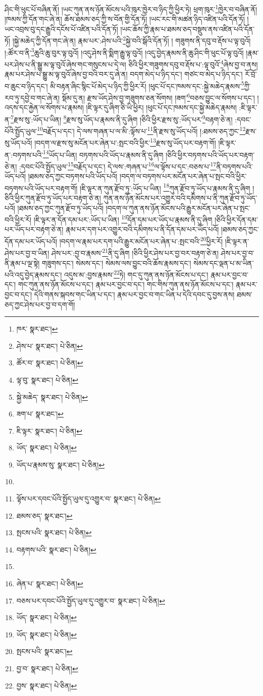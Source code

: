 ཤིང་གི་ཕུང་པོ་བཞིན་ནོ། །ཡང་ཀུན་ནས་ཉོན་མོངས་པའི་ཁུར་ཁྱེར་བ་ཉིད་ཀྱི་ཕྱིར་ཏེ། ཕྲག་ཁུར་\footnote{ཁར་  སྣར་ཐང་། }ཁྱེར་བ་བཞིན་ནོ། །ཁམས་ཀྱི་དོན་གང་ཞེ་ན། ཆོས་ཐམས་ཅད་ཀྱི་ས་བོན་གྱི་དོན་ཏོ། །ཡང་རང་གི་མཚན་ཉིད་འཛིན་པའི་དོན་ཏོ། །ཡང་འབྲས་བུ་དང་རྒྱུའི་དངོས་པོ་འཛིན་པའི་དོན་ཏོ། །ཡང་ཆོས་ཀྱི་རྣམ་པ་ཐམས་ཅད་བསྡུས་ནས་འཛིན་པའི་དོན་ཏོ། །སྐྱེ་མཆེད་ཀྱི་དོན་གང་ཞེ་ན། རྣམ་པར་:ཤེས་པའི་\footnote{ཤེས་པ་  སྣར་ཐང་།  པེ་ཅིན། }སྐྱེ་བའི་སྒོའི་དོན་ཏོ། །
གཟུགས་ནི་དབུ་བ་རྡོས་པ་ལྟ་བུའོ། །:ཚོར་བ་ནི་\footnote{ཚོར་བ་  སྣར་ཐང་།  པེ་ཅིན། }ཆུའི་ཆུ་བུར་ལྟ་བུའོ། །འདུ་ཤེས་ནི་སྨིག་རྒྱུ་ལྟ་བུའོ། །འདུ་བྱེད་རྣམས་ནི་ཆུ་ཤིང་གི་ཕུང་པོ་ལྟ་བུའོ། །རྣམ་པར་ཤེས་པ་ནི་སྒྱུ་མ་ལྟ་བུའོ་ཞེས་གང་གསུངས་པ་དེ་ལ། ཅིའི་ཕྱིར་གཟུགས་དབུ་བ་རྡོས་པ་:ལྟ་བུའོ་\footnote{ལྟ་བུ་  སྣར་ཐང་།  པེ་ཅིན། }ཞེས་བྱ་བ་ནས། རྣམ་པར་ཤེས་པ་སྒྱུ་མ་ལྟ་བུའོ་ཞེས་བྱ་བའི་བར་དུ་ཞེ་ན། བདག་མེད་པ་ཉིད་དང་། གཙང་བ་མེད་པ་ཉིད་དང་། རོ་བྲོ་བ་ཆུང་བ་ཉིད་དང་། མི་བརྟན་ཞིང་སྙིང་པོ་མེད་པ་ཉིད་ཀྱི་ཕྱིར་རོ། །ཕུང་པོ་དང་ཁམས་དང་:སྐྱེ་མཆེད་རྣམས་\footnote{སྐྱེ་མཆེད་  སྣར་ཐང་།  པེ་ཅིན། }ཀྱི་རབ་ཏུ་དབྱེ་བ་གང་ཞེ་ན། སྡོམ་དུ་ན། རྫས་ཡོད་ཤེས་བྱ་གཟུགས་ཅན་སོགས། །ཟག་\footnote{ཟག་པ་  སྣར་ཐང་། }བཅས་བྱུང་ལ་སོགས་པ་དང་། །འདས་དང་རྐྱེན་ལ་སོགས་པ་རྣམས། །ཇི་ལྟར་དུ་ཞིག་ཅི་ཡི་ཕྱིར། །ཕུང་པོ་དང་ཁམས་དང་སྐྱེ་མཆེད་རྣམས། :ཇི་ལྟར་ན་\footnote{ཇི་ལྟར་  སྣར་ཐང་།  པེ་ཅིན། }རྫས་སུ་:ཡོད་པ་ཡིན། \footnote{ཡོད་  སྣར་ཐང་།  པེ་ཅིན། }རྫས་སུ་ཡོད་པ་རྣམས་ནི་དུ་ཞིག །ཅིའི་ཕྱིར་རྫས་སུ་:ཡོད་པར་\footnote{ཡོད་པ་རྣམས་སུ་  སྣར་ཐང་།  པེ་ཅིན། }བརྟག་ཅེ་ན། :དབང་པོའི་སྤྱོད་ཡུལ་\footnote{}བརྗོད་པ་དང་། དེ་ལས་གཞན་པ་ལ་མི་:ལྟོས་པ་\footnote{ལྟོས་པར་དབང་པོའི་སྤྱོད་ཡུལ་དུ་འགྱུར་བ་  སྣར་ཐང་།  པེ་ཅིན། }ནི་རྫས་སུ་ཡོད་པའོ། །:ཐམས་ཅད་ཀྱང་\footnote{ཐམས་ཅད་  སྣར་ཐང་། }རྫས་སུ་ཡོད་པའོ། །བདག་ལ་རྫས་སུ་མངོན་པར་ཞེན་པ་:སྤང་བའི་ཕྱིར་\footnote{སྤངས་པའི་  སྣར་ཐང་།  པེ་ཅིན། }རྫས་སུ་ཡོད་པར་བརྟག་གོ། །ཇི་ལྟར་ན་:བཏགས་པའི་\footnote{བརྟགས་པའི་  སྣར་ཐང་།  པེ་ཅིན། }ཡོད་པ་ཡིན། བཏགས་པའི་ཡོད་པ་རྣམས་ནི་དུ་ཞིག །ཅིའི་ཕྱིར་བཏགས་པའི་ཡོད་པར་བརྟག་ཅེ་ན། :དབང་པོའི་སྤྱོད་ཡུལ་\footnote{}བརྗོད་པ་དང་། དེ་ལས་:གཞན་པ་\footnote{ཞེན་པ་  སྣར་ཐང་།  པེ་ཅིན། }ལ་ལྟོས་པ་དང་:བཅས་པ་\footnote{བཅས་པར་དབང་པོའི་སྤྱོད་ཡུལ་དུ་འགྱུར་བ་  སྣར་ཐང་།  པེ་ཅིན། }ནི་བཏགས་པའི་ཡོད་པའོ། །ཐམས་ཅད་ཀྱང་བཏགས་པའི་ཡོད་པའོ། །བདག་ལ་བཏགས་པར་མངོན་པར་ཞེན་པ་སྤང་བའི་ཕྱིར་བཏགས་པའི་ཡོད་པར་བརྟག་གོ། །ཇི་ལྟར་ན་ཀུན་རྫོབ་ཏུ་:ཡོད་པ་ཡིན། \footnote{ཡོད་  སྣར་ཐང་།  པེ་ཅིན། }ཀུན་རྫོབ་ཏུ་ཡོད་པ་རྣམས་ནི་དུ་ཞིག །ཅིའི་ཕྱིར་ཀུན་རྫོབ་ཏུ་ཡོད་པར་བརྟག་ཅེ་ན། ཀུན་ནས་ཉོན་མོངས་པར་འགྱུར་བའི་དམིགས་པ་ནི་ཀུན་རྫོབ་ཏུ་ཡོད་པའོ། །ཐམས་ཅད་ཀྱང་ཀུན་རྫོབ་ཏུ་ཡོད་པའོ། །བདག་ལ་ཀུན་ནས་ཉོན་མོངས་པའི་རྒྱུར་མངོན་པར་ཞེན་པ་སྤང་བའི་ཕྱིར་རོ། །ཇི་ལྟར་ན་དོན་དམ་པར་:ཡོད་པ་ཡིན། \footnote{ཡོད་  སྣར་ཐང་།  པེ་ཅིན། }དོན་དམ་པར་ཡོད་པ་རྣམས་ནི་དུ་ཞིག །ཅིའི་ཕྱིར་དོན་དམ་པར་ཡོད་པར་བརྟག་ཅེ་ན། རྣམ་པར་དག་པར་འགྱུར་བའི་དམིགས་པ་ནི་དོན་དམ་པར་ཡོད་པའོ། །ཐམས་ཅད་ཀྱང་དོན་དམ་པར་ཡོད་པའོ། །བདག་ལ་རྣམ་པར་དག་པའི་རྒྱུར་མངོན་པར་ཞེན་པ་:སྤང་བའི་\footnote{སྤངས་པའི་  སྣར་ཐང་། }ཕྱིར་རོ། །ཇི་ལྟར་ན་ཤེས་པར་བྱ་བ་ཡིན། ཤེས་པར་:བྱ་བ་རྣམས་\footnote{བྱ་བ་  སྣར་ཐང་།  པེ་ཅིན། }ནི་དུ་ཞིག །ཅིའི་ཕྱིར་ཤེས་པར་བྱ་བར་བརྟག་ཅེ་ན། ཤེས་པར་བྱ་བ་ནི་རྣམ་པ་ལྔ་སྟེ། གཟུགས་དང་། སེམས་དང་། སེམས་ལས་བྱུང་བའི་ཆོས་རྣམས་དང་། སེམས་དང་ལྡན་པ་མ་ཡིན་པའི་འདུ་བྱེད་རྣམས་དང་། འདུས་མ་:བྱས་རྣམས་\footnote{བྱས་  སྣར་ཐང་།  པེ་ཅིན། }ཏེ། གང་དུ་ཀུན་ནས་ཉོན་མོངས་པ་དང་། རྣམ་པར་བྱང་བ་དང་། གང་ཀུན་ནས་ཉོན་མོངས་པ་དང་། རྣམ་པར་བྱང་བ་དང་། གང་གིས་ཀུན་ནས་ཉོན་མོངས་པ་དང་། རྣམ་པར་བྱང་བ་དང་། དེའི་གནས་སྐབས་གང་ཡིན་པ་དང་། རྣམ་པར་བྱང་བ་གང་ཡིན་པ་དེའི་དབང་དུ་བྱས་ནས། ཐམས་ཅད་ཀྱང་ཤེས་པར་བྱ་བ་དག་གོ། 